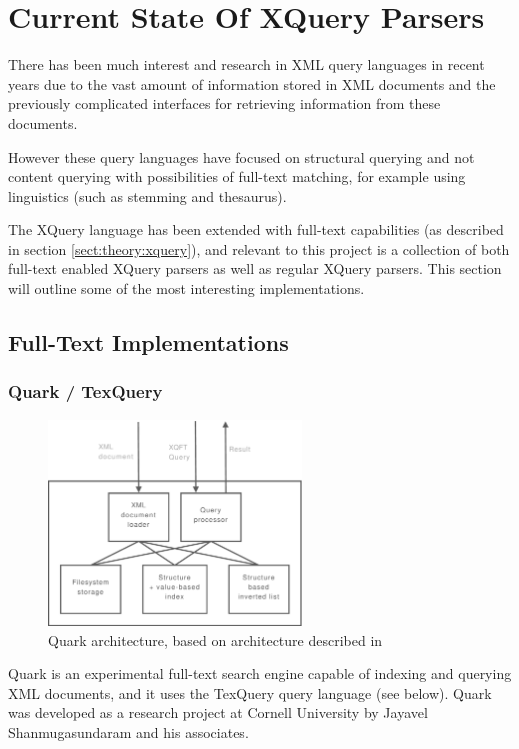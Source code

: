\section{Current State Of XQuery Parsers}
\label{sect:theory:stateoftheart}
There has been much interest and research in XML query languages in recent
years due to the vast amount of information stored in XML documents and the
previously complicated interfaces for retrieving information from these documents.

However these query languages have focused on structural querying and not
content querying with possibilities of full-text matching, for example using
linguistics (such as stemming and thesaurus).

The XQuery language has been extended with full-text capabilities (as described
in section \ref{sect:theory:xquery}), and relevant to this project is a
collection of both full-text enabled XQuery parsers as well as regular XQuery
parsers. This section will outline some of the most interesting implementations.

\subsection{Full-Text Implementations}
\subsubsection{Quark / TexQuery}
\begin{figure}[!h]
  \centering
    \includegraphics[width=0.6\textwidth]{diagrams/quark_arch}
  \caption[Quark architecture]{Quark architecture, based on architecture described in
  \cite{quark_efficientxquery}}
\end{figure}

Quark is an experimental full-text search engine capable of indexing and
querying XML documents, and it uses the TexQuery query language (see below). 
Quark was developed as a research project at Cornell University by Jayavel 
Shanmugasundaram and his associates.

